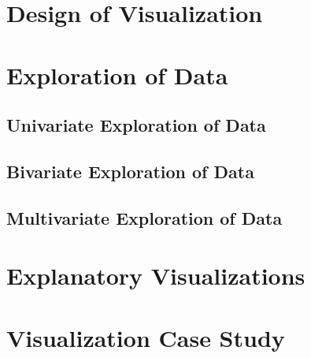 \documentclass{article}
\begin{document}
\section{Design of Visualization}\label{sec:concept1}


\section{Exploration of Data}\label{sec:concept2}
\subsection{Univariate Exploration of Data}\label{sec:concept2.1}


\subsection{Bivariate Exploration of Data}\label{sec:concept2.2}


\subsection{Multivariate Exploration of Data}\label{sec:concept2.3}


\section{Explanatory Visualizations}\label{sec:concept3}


\section{Visualization Case Study}\label{sec:concept4}

	
\end{document}
